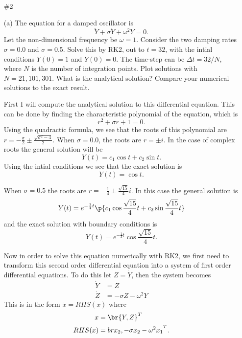 \documentclass[11pt, oneside]{article}
\begin{document}
\begin{enumerate}
  \item[\#2] %
    \item[(a)] %
      The equation for a damped oscillator is
      \[
        \ddot{Y} + \sigma \dot{Y} + \omega^2 Y = 0.
      \]
      Let the non-dimensional frequency be $\omega = 1$.
      Consider the two damping rates $\sigma=0.0$ and $\sigma=0.5$.
      Solve this by RK2, out to $t = 32$, with the intial conditions $Y(0) = 1$
      and $\dot{Y}(0) = 0$.
      The time-step can be $\Delta t = 32/N$, where $N$ is the number of
      integration points.
      Plot solutions with $N = 21, 101, 301$.
      What is the analytical solution?
      Compare your numerical solutions to the exact result.

      First I will compute the analytical solution to this differential
      equation.
      This can be done by finding the characteristic polynomial of the equation,
      which is
      \[
        r^2 + \sigma r + 1 = 0.
      \]
      Using the quadractic formula, we see that the roots of this polynomial
      are $r = -\frac{\sigma}{2} \pm \frac{\sqrt{\sigma^2 - 4}}{2}$.
      When $\sigma = 0.0$, the roots are $r = \pm i$.
      In the case of complex roots the general solution will be
      \[
        Y(t) = c_1 \cos{t} + c_2 \sin{t}.
      \]
      Using the intial conditions we see that the exact solution is
      \[
        Y(t) = \cos{t}.
      \]

      When $\sigma = 0.5$ the roots are $r = -\frac{1}{4} \pm \frac{\sqrt{15}}{4} i$.
      In this case the general solution is
      \[
        Y(t) = e^{-\frac{1}{4}t} \p{c_1 \cos{\frac{\sqrt{15}}{4} t} + c_2 \sin{\frac{\sqrt{15}}{4} t}}
      \]
      and the exact solution with boundary conditions is
      \[
        Y(t) = e^{-\frac{1}{4}t} \cos{\frac{\sqrt{15}}{4} t}.
      \]

      Now in order to solve this equation numerically with RK2, we first need to
      transform this second order differential equation into a system of first
      order differential equations.
      To do this let $Z = \dot{Y}$, then the system becomes
      \begin{align*}
        \dot{Y} &= Z \\
        \dot{Z} &= -\sigma Z - \omega^2 Y
      \end{align*}
      This is in the form $\dot{x} = RHS(x)$ where
      \begin{align*}
        x &= \br{Y, Z}^T \\
        RHS(x) &= br{x_2, -\sigma x_2 - \omega^2 x_1}^T.
      \end{align*}


\end{enumerate}
\end{document}
